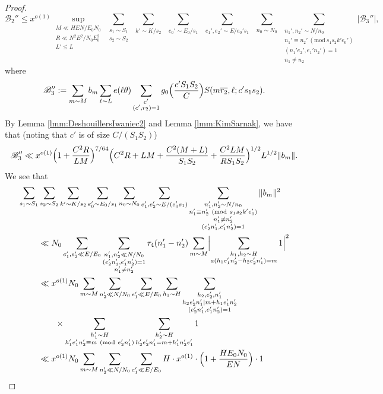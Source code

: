 \documentclass[10pt]{amsart}
\theoremstyle{plain}
\numberwithin{equation}{section}
\newcommand{\Mod}[1]{\ (\mathrm{mod}\ #1)}
\begin{document}
\begin{proof}
\[
\mathscr{B}_2''\le x^{o(1)}\sup_{\substack{M\ll HEN/E_0N_0\\ R\ll N^2E^2/N_0E_0^2\\ L'\le L}}\sum_{\substack{s_1\sim S_1\\ s_2\sim S_2}}\sum_{\substack{k'\sim K/s_2}} \sum_{\substack{e_0'\sim E_0/s_1}}\sum_{\substack{e_1',e_2'\sim E/e_0's_1}}\sum_{\substack{n_0\sim N_0}}\sum_{\substack{n_1',n_2'\sim N/n_0\\ n_1'\equiv n_2'\Mod{s_1s_2 k' e_0'}\\ (n_1'e_2',e_1'n_2')=1\\ n_1\ne n_2}}|\mathscr{B}_3''|,
\]
where
\[
\mathscr{B}_3'':=\sum_{m\sim M}b_{m}\sum_{\ell\sim L}e(\ell\theta)\sum_{\substack{c'\\(c',r_2)=1}}g_0\Bigl(\frac{c'S_1S_2}{C}\Bigr)S(m\overline{r_2},\ell;c's_1s_2).
\]
By Lemma \ref{lmm:DeshouillersIwaniec2} and Lemma \ref{lmm:KimSarnak}, we have that (noting that $c'$ is of size $C/(S_1S_2)$)
\[
\mathscr{B}_3''\ll x^{o(1)}\Bigl(1+\frac{C^2 R}{L M}\Bigr)^{7/64}\Bigl(C^2 R+L M+\frac{C^2 (M+L)}{S_1 S_2}+\frac{C^2 L M}{R S_1 S_2}\Bigr)^{1/2}L^{1/2}\|b_{m}\|.
\]
We see that
\begin{align*}
\sum_{s_1\sim S_1}&\sum_{s_2\sim S_2}\sum_{k'\sim K/s_2}\sum_{e_0'\sim E_0/s_1}\sum_{n_0\sim N_0}\sum_{\substack{e_1',e_2'\sim E/(e_0's_1)}}\sum_{\substack{n_1',n_2'\sim N/n_0\\ n_1'\equiv n_2'\Mod{s_1s_2 k' e_0'}\\n_1'\ne n_2'\\ (e_2'n_1',e_1'n_2')=1}}\|b_{m}\|^2\\
&\ll N_0 \sum_{e_1',e_2'\ll E/E_0}\sum_{\substack{n_1',n_2'\ll N/N_0\\ (e_2'n_1',e_1'n_2')=1\\ n_1'\ne n_2'}}\tau_4(n_1'-n_2')\sum_{m\sim M}\Bigl|\sum_{\substack{h_1,h_2\sim H\\ a(h_1e_1'n_2'-h_2e_2'n_1')=m}}1\Bigr|^2\\
&\ll x^{o(1)}N_0\sum_{m\sim M}\sum_{n_2'\ll N/N_0}\sum_{e_1'\ll E/E_0}\sum_{h_1\sim H}\sum_{\substack{h_2,e_2',n_1'\\ h_2e_2'n_1'|m+h_1e_1'n_2'\\ (e_2'n_1',e_1'n_2')=1}}\\
&\qquad\times\sum_{\substack{h_1'\sim H\\ h_1'e_1'n_2'\equiv m\Mod{e_2'n_1'}}}\sum_{\substack{h_2'\sim H\\ h_2'e_2'n_1'=m+h_1'n_2'e_1'}}1\\
&\ll x^{o(1)}N_0 \sum_{m\sim M}\sum_{n_2'\ll N/N_0}\sum_{e_1'\ll E/E_0}H \cdot x^{o(1)}\cdot \Bigl(1+\frac{H E_0 N_0}{E N}\Bigr)\cdot 1\\

\end{align*}
\end{proof}
\end{document}
